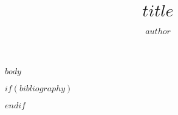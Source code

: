 \documentclass[$if(fontsize)$$fontsize$,$endif$$if(handout)$handout,$endif$$if(beamer)$ignorenonframetext,$endif$$for(classoption)$$classoption$$sep$,$endfor$]{$documentclass$}
\title
{$title$}
\author
{$author$}
\institute[fu:stat]
{$institute$}
\begin{document}
\begin{frame}[plain]

  \titlepage

\end{frame}



$body$


$if(bibliography)$
\begin{frame}[allowframebreaks]


\printbibliography
\end{frame}
$endif$
\end{document}
